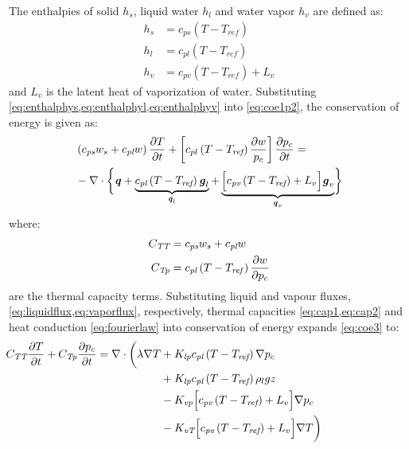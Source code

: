 The enthalpies of solid $h_s$, liquid water $h_l$ and water vapor $h_v$ are defined as:
\begin{align}
h_s &= c_{ps} \left(T - T_{\textit{ref}}\right) \label{eq:enthalphys}\\
h_l &= c_{pl} \left(T - T_{\textit{ref}}\right) \label{eq:enthalphyl}\\
h_v &= c_{pv} \left(T - T_{\textit{ref}}\right) + L_v \label{eq:enthalphyv}
\end{align}
and $L_v$ is the latent heat of vaporization of water. Substituting \cref{eq:enthalphys,eq:enthalphyl,eq:enthalphyv} into \cref{eq:coe1p2}, the conservation of energy is given as:
\begin{equation}
\begin{split}
&\left(c_{\textit{ps}} w_s + c_{\textit{pl}} w\right)\frac{\partial T}{\partial t} + \left[c_{pl} \left(T - T_{\textit{ref}}\right) \frac{\partial w}{p_c}\right]\frac{\partial p_c}{\partial t} =\\
& - \nabla \cdot \bigg\{ {\textbf{\textit{q}} + \underbrace{ c_{\textit{pl}} \left(T - T_{\textit{ref}}\right)\textbf{\textit{g}}_l}_{\textbf{\textit{q}}_l} + \underbrace{ \Big[c_{\textit{pv}} \left(T - T_{\textit{ref}}\right) + L_v\Big]\textbf{\textit{g}}_v}_{\textbf{\textit{q}}_v} } \bigg\}
\end{split}
\label{eq:coe3}
\end{equation}
where:
\begin{align}
C_{\textit{TT}} &=  c_{\textit{ps}}w_s + c_{\textit{pl}}w \label{eq:cap1} \\
C_{\textit{Tp}} &=  c_{\textit{pl}} \left( T - T_{\mathit{ref}}\right) \frac{\partial w}{\partial p_c} \label{eq:cap2} 
\end{align}
are the thermal capacity terms. Substituting liquid and vapour fluxes, \cref{eq:liquidflux,eq:vaporflux}, respectively, thermal capacities \cref{eq:cap1,eq:cap2} and heat conduction \cref{eq:fourierlaw} into conservation of energy expands \cref{eq:coe3} to:
\begin{align}
\begin{aligned}
		\mathllap{C_{\textit{TT}}\frac{\partial T}{\partial t} + C_{\textit{Tp}}\frac{\partial p_c}{\partial t}} = \nabla \cdot \bigg(\lambda \nabla T &+  K_{\textit{lp}} c_{\textit{pl}} \left(T - T_{\textit{ref}}\right)  \nabla p_c \\
					&+ K_{\textit{lp}} c_{\textit{pl}} \left(T - T_{\textit{ref}}\right) \rho_l g z\\
					&- K_{\textit{vp}} \Big[c_{\textit{pv}} \left(T - T_{\textit{ref}}\right) + L_v\Big] \nabla p_c \\ 
					&- K_{\textit{vT}} \Big[c_{\textit{pv}} \left(T - T_{\textit{ref}}\right) + L_v\Big] \nabla T \bigg)
\end{aligned}
\end{align}

